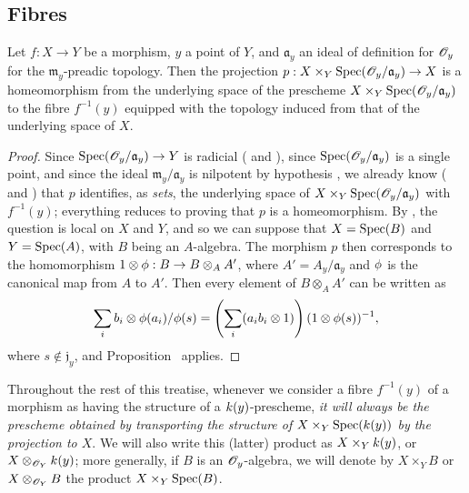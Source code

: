 \subsection{Fibres}
\label{subsection:I.3.6}

\begin{proposition}[3.6.1]
\label{I.3.6.1}
Let $f:X\to Y$ be a morphism, $y$ a point of $Y$, and $\mathfrak{a}_y$ an ideal of definition for $\mathscr{O}_y$ for the $\mathfrak{m}_y$-preadic topology.
Then the projection $p:X\times_Y\Spec(\sh{O}_y/\mathfrak{a}_y)\to X$ is a homeomorphism from the underlying space of the prescheme $X\times_Y\operatorname{Spec}(\mathscr{O}_y/\mathfrak{a}_y)$ to the fibre $f^{-1}(y)$ equipped with the topology induced from that of the underlying space of $X$.
\end{proposition}

\begin{proof}
\label{proof-I.3.6.1}
Since $\Spec(\sh{O}_y/\mathfrak{a}_y)\to Y$ is radicial ( and ), since $\operatorname{Spec}(\mathscr{O}_y/\mathfrak{a}_y)$ is a single point, and since the ideal $\mathfrak{m}_y/\mathfrak{a}_y$ is nilpotent by hypothesis , we already know ( and ) that $p$ identifies, as \emph{sets}, the underlying space of $X\times_Y\operatorname{Spec}(\mathscr{O}_y/\mathfrak{a}_y)$ with $f^{-1}(y)$; everything reduces to proving that $p$ is a homeomorphism.
By , the question is local on $X$ and $Y$, and so we can suppose that $X=\operatorname{Spec}(B)$ and $Y=\operatorname{Spec}(A)$, with $B$ being an $A$-algebra.
The morphism $p$ then corresponds to the homomorphism $1\otimes\vphi:B\to B\otimes_A A'$, where $A'=A_y/\mathfrak{a}_y$ and $\phi$ is the canonical map from $A$ to $A'$.
Then every element of $B\otimes_A A'$ can be written as
\[
  \sum_i b_i\otimes\phi(a_i)/\phi(s)=\left(\sum_i(a_ib_i\otimes1)\right)(1\otimes\phi(s))^{-1},
\]
where $s\not\in\mathfrak{j}_y$, and Proposition~ applies.
\end{proof}

\begin{env}[3.6.2]
\label{I.3.6.2}
Throughout the rest of this treatise, whenever we consider a fibre $f^{-1}(y)$ of a morphism as having the structure of a $k(y)$-prescheme, \emph{it will always be the prescheme obtained by transporting the structure of $X\times_Y\operatorname{Spec}(k(y))$ by the projection to $X$}.
We will also write this (latter) product as $X\times_Yk(y)$, or $X\otimes_{\mathscr{O}_Y}k(y)$; more generally, if $B$ is an $\mathscr{O}_y$-algebra, we will denote by $X\times_Y B$ or $X\otimes_{\mathscr{O}_Y}B$ the product $X\times_Y\operatorname{Spec}(B)$.
\end{env}

